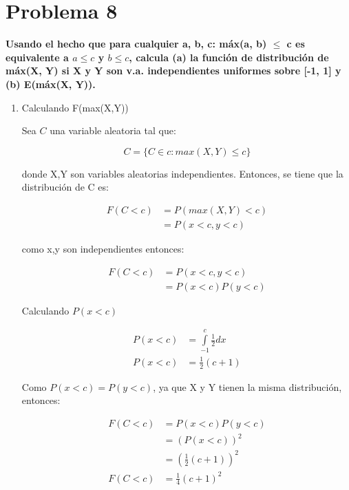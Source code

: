 \section*{Problema 8}

\textbf{Usando el hecho que para cualquier a, b, c: máx(a, b) $\leq$ c es equivalente a $a \leq c$ y $b \leq c$, calcula (a) la función de distribución de máx(X, Y) si X y Y son v.a. independientes uniformes sobre [-1, 1] y (b) E(máx(X, Y)).}

\begin{enumerate}
    \item Calculando F(max(X,Y))

          Sea $C$ una variable aleatoria tal que:

          \begin{equation*}
              C =  \{C \in c : max(X,Y)\leq c\}
          \end{equation*}

          donde X,Y son variables aleatorias independientes. Entonces, se tiene que la distribución de C es:

          \begin{align*}
              F(C<c) & = P(max(X,Y)<c) \\
                     & = P(x<c,y<c)
          \end{align*}

          como x,y son independientes entonces:

          \begin{align*}
              F(C<c) & = P(x<c,y<c)   \\
                     & = P(x<c)P(y<c)
          \end{align*}

          Calculando $P(x<c)$

          \begin{align*}
              P(x<c) & = \int\limits_{-1}^c \frac{1}{2} dx \\
              P(x<c) & = \frac{1}{2}(c+1)
          \end{align*}

          Como $P(x<c)=P(y<c)$, ya que X y Y tienen la misma distribución, entonces:

          \begin{align*}
              F(C<c) & = P(x<c)P(y<c)                       \\
                     & = (P(x<c))^2                         \\
                     & = \left (\frac{1}{2}(c+1) \right )^2 \\
              F(C<c) & = \frac{1}{4} (c+1)^2
          \end{align*}


\end{enumerate}
